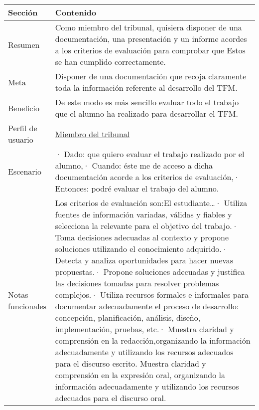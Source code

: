 \begin{table}[H]
    \centering
    \def\arraystretch{1.25}
    \begin{adjustbox}{max width=\textwidth}
    \begin{tabularx}{\textwidth}{|l|L|}
    \hline
        \textbf{Sección} & \textbf{Contenido} \\ \hline
    \hline
        Resumen & Como miembro del tribunal, quisiera disponer de una documentación, una presentación y un informe acordes a los criterios de evaluación para comprobar que Estos se han cumplido correctamente. \\ \hline
        Meta & Disponer de una documentación que recoja claramente toda la información referente al desarrollo del TFM. \\ \hline
        Beneficio & De este modo es más sencillo evaluar todo el trabajo que el alumno ha realizado para desarrollar el TFM. \\ \hline
        Perfil de usuario & \hyperref[sec:personaMiembroTribunal]{Miembro del tribunal} \\ \hline
        Escenario & · Dado: que quiero evaluar el trabajo realizado por el alumno,\linebreak · Cuando: éste me de acceso a dicha documentación acorde a los criterios de evaluación,\linebreak · Entonces: podré evaluar el trabajo del alumno. \\ \hline
        Notas funcionales & Los criterios de evaluación son:\linebreak \linebreak El estudiante…\linebreak · Utiliza fuentes de información variadas, válidas y fiables y selecciona la relevante para el objetivo del trabajo.\linebreak · Toma decisiones adecuadas al contexto y propone soluciones utilizando el conocimiento adquirido.\linebreak · Detecta y analiza oportunidades para hacer nuevas propuestas.\linebreak · Propone soluciones adecuadas y justifica las decisiones tomadas para resolver problemas complejos.\linebreak · Utiliza recursos formales e informales para documentar adecuadamente el proceso de desarrollo: concepción, planificación, análisis, diseño, implementación, pruebas, etc.\linebreak · Muestra claridad y comprensión en la redacción,organizando la información adecuadamente y utilizando los recursos adecuados para el discurso escrito. Muestra claridad y comprensión en la expresión oral, organizando la información adecuadamente y utilizando los recursos adecuados para el discurso oral. \\ \hline

\end{tabularx}
\end{adjustbox}
\end{table}
